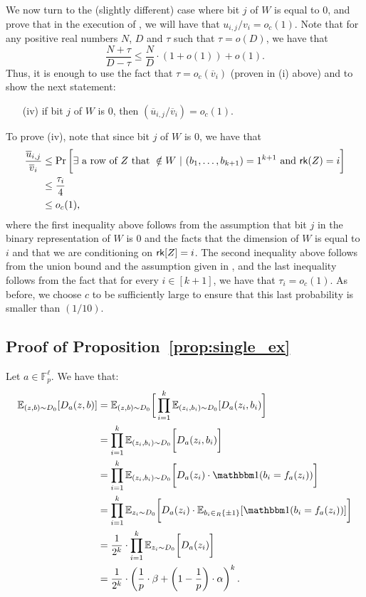 	We now turn to the (slightly different) case where bit $j$ of $W$ is equal to $0$, and prove that in the execution of , we will have that $u_{i,j}/v_i = o_c(1)$. Note that for any positive real numbers $N$, $D$ and $\tau$ such that $\tau = o(D)$, we have that
	\begin{equation*}
	\frac{N+\tau}{D-\tau} \le \frac{N}{D} \cdot (1+o(1)) + o(1).
	\end{equation*}
	Thus, it is enough to use the fact that $\tau = o_c( \overline{v}_i )$ (proven in (i) above) and to show the next statement:
	\begin{enumerate}
		\item[(iv)] if bit $j$ of $W$ is $0$, then $(\overline{u}_{i,j}/\overline{v}_i)	= o_c(1)$.
	\end{enumerate}
	
	To prove (iv), note that since bit $j$ of $W$ is $0$, we have that
	\begin{align*}
	\frac{\overline{u}_{i,j}}{\overline{v}_i} &\le \Pr\bigg[\exists\text{ a row of } Z \text{ that } \notin W ~ | ~ (b_1,\dots,b_{k+1}) = 1^{k+1}\mbox{ and }\mathsf{rk}(Z) = i \bigg]\\
	&\le \frac{\tau_i}{4}\\
	&\le o_c(1),
	\end{align*}
	where the first inequality above follows from the assumption that bit $j$ in the binary representation of $W$ is $0$ and the facts that the dimension of $W$ is equal to $i$ and that we are conditioning on $\mathsf{rk}[Z] = i$. The second inequality above follows from the union bound and the assumption given in , and the last inequality follows from the fact that for every $i \in [k+1]$, we have that $\tau_i = o_c(1)$. As before, we choose $c$ to be sufficiently large to ensure that this last probability is smaller than $(1/10)$.


\subsection{Proof of Proposition~\ref{prop:single_ex}}
Let $a \in \mathbb{F}_p^{\ell}$. We have that:
	\begin{align*}
	\Ex_{(z,b) \sim D_0}[D_a(z,b)] &= \Ex_{(z,b) \sim D_0}\bigg[\displaystyle\prod\limits_{i=1}^k \Ex_{(z_i,b_i) \sim D_0}[D_a(z_i,b_i)\bigg]\\
	&= \displaystyle\prod\limits_{i=1}^k \Ex_{(z_i,b_i) \sim D_0}\bigg[ D_a(z_i,b_i)\bigg]\\
	&= \displaystyle\prod\limits_{i=1}^k \Ex_{(z_i,b_i) \sim D_0}\bigg[ D_a(z_i) \cdot \ind(b_i = f_a(z_i))\bigg]\\
	&= \displaystyle\prod\limits_{i=1}^k \Ex_{z_i \sim D_0}\bigg[ D_a(z_i) \cdot \Ex_{b_i \in_R \{\pm 1\}}[\ind(b_i = f_a(z_i))]\bigg]\\
	&= \frac{1}{2^k} \cdot \displaystyle\prod\limits_{i=1}^k \Ex_{z_i \sim D_0}\bigg[ D_a(z_i) \bigg]\\
	&= \frac{1}{2^k} \cdot \left(\frac{1}{p} \cdot \beta + \left(1-\frac{1}{p}\right) \cdot \alpha\right)^k.
	\end{align*}


